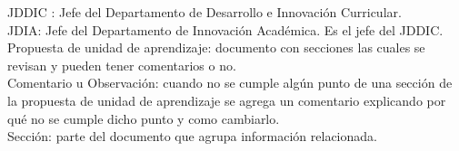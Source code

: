 JDDIC : Jefe del Departamento de Desarrollo e Innovación Curricular.\\
JDIA: Jefe del Departamento de Innovación Académica. Es el jefe del JDDIC.\\
Propuesta de unidad de aprendizaje: documento con secciones las cuales se revisan y pueden tener comentarios o no.\\
Comentario u Observación: cuando no se cumple algún punto de una sección de la propuesta de unidad de aprendizaje se agrega un comentario explicando por qué no se cumple dicho punto y como cambiarlo.\\
Sección: parte del documento que agrupa información relacionada.\\

